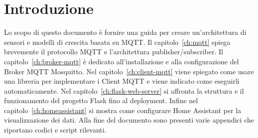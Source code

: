 
\chapter*{Introduzione}


Lo scopo di questo documento è fornire una guida 
per creare un'architettura di sensori e modelli di crescita basata su MQTT.
Il capitolo~\ref{ch:mqtt} spiega brevemente il protocollo MQTT 
e l'architettura publisher/subscriber. 
Il capitolo~\ref{ch:broker-mqtt} è dedicato all'installazione 
e alla configurazione del Broker MQTT Mosquitto.
Nel capitolo~\ref{ch:client-mqtt} viene spiegato come usare una libreria 
per implementare i Client MQTT e viene indicato come eseguirli automaticamente.
Nel capitolo~\ref{ch:flask-web-server} si affronta la struttura e il funzionamento
del progetto Flask fino al deployment.
Infine nel capitolo~\ref{ch:homeassistant} si mostra come configurare
Home Assistant per la visualizzazione dei dati.
Alla fine del documento sono presenti varie appendici 
che riportano codici e script rilevanti.

